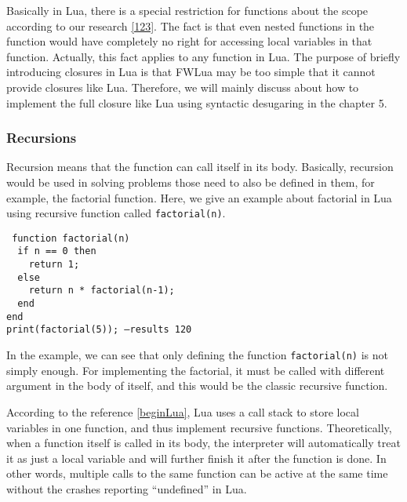 \documentclass{article}
\begin{document}
Basically in Lua, there is a special restriction for functions about the scope according to our research \ref{123}. The fact is that even nested functions in the function would have completely no right for accessing local variables in that function. Actually, this fact applies to any function in Lua. The purpose of briefly introducing closures in Lua is that FWLua may be too simple that it cannot provide closures like Lua. Therefore, we will mainly discuss about how to implement the full closure like Lua using syntactic desugaring in the chapter 5. 


\subsubsection{Recursions}\label{sec:recursions}

Recursion means that the function can call itself in its body. Basically, recursion would be used in solving problems those need to also be defined in them, for example, the factorial function. Here, we give an example about factorial in Lua using recursive function called {\tt factorial(n)}.
\begin{flushleft}
{\tt
function factorial(n)\\
~~if n == 0 then\\
~~~~return 1;\\
~~else\\
~~~~return n * factorial(n-1);\\
~~end\\
end\\

print(factorial(5)); --results 120\\
}
\end{flushleft}

In the example, we can see that only defining the function {\tt factorial(n)} is not simply enough. For implementing the factorial, it must be called with different argument in the body of itself, and this would be the classic recursive function.

According to the reference \ref{beginLua}, Lua uses a call stack to store local variables in one function, and thus implement recursive functions. Theoretically, when a function itself is called in its body, the interpreter will automatically treat it as just a local variable and will further finish it after the function is done. In other words, multiple calls to the same function can be active at the same time without the crashes reporting ``undefined'' in Lua.
\end{document}
